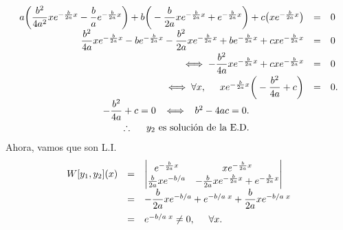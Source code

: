 \documentclass{beamer}
\begin{document}
\begin{frame}[t]
	\begin{block}{}
		\footnotesize 
		\[
			\begin{array}{rcl}
				a \bigg(\dfrac{b^2}{4a^2} xe^{- \frac{b}{2a} x} - \dfrac{b}{a} e^{- \frac{b}{2a} x}\bigg) + b \bigg(- \dfrac{b}{2a} xe^{- \frac{b}{2a} x} + e^{- \frac{b}{2a} x}\bigg) +c \big(xe^{- \frac{b}{2a} x}\big) & = & 0 \\[2mm]
				\dfrac{b^2}{4a} xe^{- \frac{b}{2a} x} - b e^{- \frac{b}{2a} x} - \dfrac{b^2}{2a} xe^{- \frac{b}{2a} x} +be^{- \frac{b}{2a} x} +cx e^{- \frac{b}{2a} x} & = & 0 \\[2mm]
				\iff - \dfrac{b^2}{4a} xe^{- \frac{b}{2a} x} +cxe^{- \frac{b}{2a} x} & = & 0 \\[2mm]
				\iff \forall x, \hspace{5mm} xe^{- \frac{b}{2a} x} \bigg(- \dfrac{b^2}{4a} +c\bigg) & = & 0.\\
				- \dfrac{b^2}{4a} +c=0 \;\; \iff \;\; b^2-4ac=0. \hspace{2cm} &&\\[2mm]
				\therefore \hspace{5mm} y_2 \mbox{ es solución de la E.D.} \hspace{2cm} &&
			\end{array}
		\]
		Ahora, vamos que son L.I. \vspace{-5mm}
		\[
			\begin{array}{rcl}
				W[y_1,y_2] (x) & = & \begin{vmatrix}
					e^{- \frac{b}{2a} x} & xe^{- \frac{b}{2a} x} \\
					\frac{b}{2a} xe^{-b/a} & - \frac{b}{2a} xe^{- \frac{b}{2a} x} +e^{- \frac{b}{2a} x}
				\end{vmatrix}\\
				& = & - \dfrac{b}{2a} xe^{-b/a} +e^{-b/a\;x} + \dfrac{b}{2a} xe^{-b/a\;x} \\[3mm]
				& = & e^{-b/a\;x} \ne 0, \hspace{5mm} \forall x.
			\end{array}
		\]
	\end{block}
\end{frame}
\end{document}

